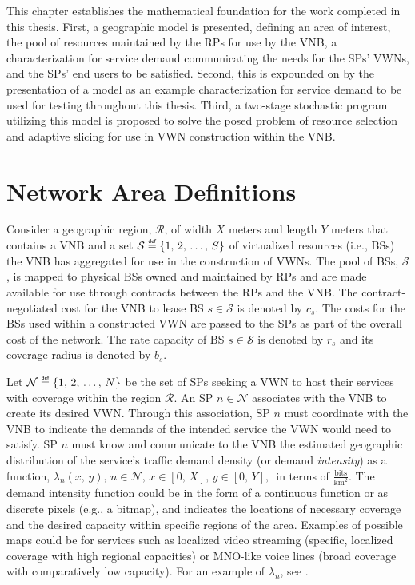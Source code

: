 \documentclass[12pt,dvipsnames]{report}
\newcommand\defeq{\mathrel{\overset{\makebox[0pt]{\mbox{\normalfont\tiny\sffamily def}}}{=}}}
\begin{document}
This chapter establishes the mathematical foundation for the work completed in this thesis.  First, a geographic model is presented, defining an area of interest, the pool of resources maintained by the RPs for use by the VNB, a characterization for service demand communicating the needs for the SPs' VWNs, and the SPs' end users to be satisfied.  Second, this is expounded on by the presentation of a model as an example characterization for service demand to be used for testing throughout this thesis.  Third, a two-stage stochastic program utilizing this model is proposed to solve the posed problem of resource selection and adaptive slicing for use in VWN construction within the VNB.

\section{Network Area Definitions} \label{sec:networkdefs}

Consider a geographic region, $\mathcal{R}$, of width $X$ meters and length $Y$ meters that contains a VNB and a set $\mathcal{S} \defeq \left\{ 1,\, 2,\, \ldots,\, S \right\}$ of virtualized resources (i.e., BSs) the VNB has aggregated for use in the construction of VWNs.  The pool of BSs, $\mathcal{S}$, is mapped to physical BSs owned and maintained by RPs and are made available for use through contracts between the RPs and the VNB.  The contract-negotiated cost for the VNB to lease BS $s \in \mathcal{S}$ is denoted by $c_s$.  The costs for the BSs used within a constructed VWN are passed to the SPs as part of the overall cost of the network.  The rate capacity of BS $s \in \mathcal{S}$ is denoted by $r_s$ and its coverage radius is denoted by $b_s$.

Let $\mathcal{N} \defeq \left\{ 1,\, 2,\, \ldots,\, N \right\}$ be the set of SPs seeking a VWN to host their services with coverage within the region $\mathcal{R}$.  An SP $n \in \mathcal{N}$ associates with the VNB to create its desired VWN.  Through this association, SP $n$ must coordinate with the VNB to indicate the demands of the intended service the VWN would need to satisfy.  SP $n$ must know and communicate to the VNB the estimated geographic distribution of the service's traffic demand density (or demand \emph{intensity}) as a function, $\lambda_n\left( x,\, y \right),\, n \in \mathcal{N},\, x \in \left[ 0,\, X \right],\, y \in \left[ 0,\, Y \right],\,$ in terms of $\frac{\text{bits}}{\text{km}^2}$.  The demand intensity function could be in the form of a continuous function or as discrete pixels (e.g., a bitmap), and indicates the locations of necessary coverage and the desired capacity within specific regions of the area.  Examples of possible maps could be for services such as localized video streaming (specific, localized coverage with high regional capacities) or MNO-like voice lines (broad coverage with comparatively low capacity).  For an example of $\lambda_n$, see .
\end{document}
